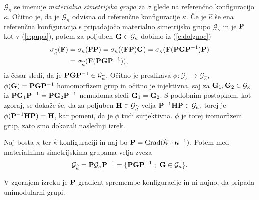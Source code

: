 $\mathcal{G}_{\kappa}$ se imenuje \emph{materialna simetrijska grupa} za $\sigma$ glede
na referenčno konfiguracijo $\kappa$. Očitno je, da je $\mathcal{G}_{\kappa}$ odvisna od
referenčne konfiguracije $\kappa$. Če je $\widehat{\kappa}$ še ena referenčna konfiguracija
s pripadajočo materialno simetrijsko grupo $\mathcal{G}_{\widehat{\kappa}}$
in je $\mathbf P$ kot v (\ref{e:pupa}), potem za poljuben
$\mathbf G\in\mathcal{G}_{\kappa}$ dobimo iz (\ref{e:dolgnoc})
\begin{align*}
	\sigma_{\widehat{\kappa}}(\mathbf F)&=\sigma_{\kappa}(\mathbf F\mathbf P)
	=\sigma_{\kappa}((\mathbf F\mathbf P)\mathbf G)
	=\sigma_{\kappa}(\mathbf F(\mathbf P\mathbf G\mathbf P^{-1})\mathbf P) \\
	&=\sigma_{\widehat{\kappa}}(\mathbf F(\mathbf P\mathbf G\mathbf P^{-1})),
\end{align*}
iz česar sledi, da je $\mathbf P\mathbf G\mathbf P^{-1}\in\mathcal{G}_{\widehat{\kappa}}$.
Očitno je preslikava $\phi\colon\mathcal{G}_{\kappa}\to\mathcal{G}_{\widehat{\kappa}}$,
$\phi(\mathbf G)=\mathbf P\mathbf G\mathbf P^{-1}$ homomorfizem grup in očitno je injektivna,
saj za $\mathbf G_1,\mathbf G_2\in\mathcal{G}_{\kappa}$ iz
$\mathbf P\mathbf G_1\mathbf P^{-1}=\mathbf P\mathbf G_2\mathbf P^{-1}$ nemudoma sledi $\mathbf G_1=\mathbf G_2$.
S podobnim postopkom, kot zgoraj, se dokaže še, da za poljuben $\mathbf H\in\mathcal{G}_{\widehat{\kappa}}$
velja $\mathbf P^{-1}\mathbf H\mathbf P\in\mathcal{G}_{\kappa}$, torej je
$\phi(\mathbf P^{-1}\mathbf H\mathbf P)=\mathbf H$, kar pomeni, da je $\phi$ tudi surjektivna.
$\phi$ je torej izomorfizem grup, zato smo dokazali naslednji izrek.

\begin{izrek}
	Naj bosta $\kappa$ ter $\widehat{\kappa}$ konfiguraciji in naj bo
	$\mathbf P=\mathrm{Grad}(\widehat{\boldsymbol \kappa}\circ\boldsymbol \kappa^{-1})$. Potem
	med materialnima simetrijskima grupama velja zveza
	\[
		\mathcal{G}_{\widehat{\kappa}}=\ten{P}\mathcal{G}_{\kappa}\ten{P}^{-1}
		=\{\ten{P}\ten{G}\ten{P}^{-1}\;;\ \ten{G}\in\mathcal{G}_{\kappa}\}.
	\]
\end{izrek}

V zgornjem izreku je $\mathbf P$ gradient spremembe konfiguracije in ni nujno,
da pripada unimodularni grupi.

\begin{comment}
Podobno, kot smo definirali materialno simetrijsko grupo za $\sigma$, bi lahko
definirali tudi materialno simetrijsko grupo za $\ten{T}$. Za elastične
materiale velja definicija, da je materialno telo \emph{trdno}, če obstaja
referenčna konfiguracija telesa, tako da je materialna simetrijska grupa za $\ten{T}$
glede na to konfiguracijo podgrupa ortogonalne grupe $\mathscr{O}(V)$.
Taki referenčni konfiguraciji se reče \emph{naravna referenčna konfiguracija}. Dokazati se da,
da sta pri hiperelastičnih trdnih telesih materialni simetrijski grupi za $\sigma$ in za $\ten{T}$ enaki.
\end{comment}


